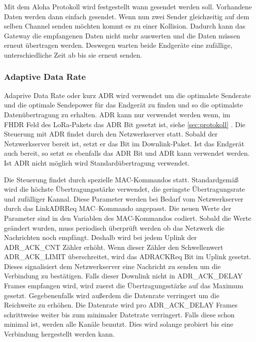 \documentclass[a4paper, 12pt]{article}
\begin{document}
            Mit dem Aloha Protokoll wird festgestellt wann gesendet werden soll. Vorhandene Daten werden dann einfach 
            gesendet. Wenn nun zwei Sender gleichzeitig auf dem selben Channel senden 
            möchten kommt es zu einer Kollision. Dadurch kann das Gateway die empfangenen Daten nicht mehr auswerten 
            und die Daten müssen erneut übertragen werden. Deswegen warten beide Endgeräte eine zufällige, 
            unterschiedliche Zeit ab bis sie erneut senden.

            \subsubsection{Adaptive Data Rate}\label{sec:ADR}
                Adaprive Data Rate oder kurz ADR wird verwendet um die optimalste Senderate und die optimale 
                Sendepower für das Endgerät zu finden und so die optimalste Datenübertragung zu erhalten. ADR kann nur 
                verwendet werden wenn, im FHDR Feld des LoRa-Pakets das ADR Bit gesetzt ist, siehe 
                \ref{sec:protokoll} . Die Steuerung mit ADR findet durch den Netzwerkserver statt. Sobald der 
                Netzwerkserver bereit ist, setzt er das Bit im Downlink-Paket. Ist das Endgerät auch bereit, so 
                setzt es ebenfalls das ADR Bit und ADR kann verwendet werden. Ist ADR nicht möglich wird Standardübertragung 
                verwendet.

                Die Steuerung findet durch spezielle MAC-Kommandos statt. Standardgemäß wird die höchste 
                Übertragungsstärke verwendet, die geringste Übertragungsrate und zufälliger Kannal. Diese Parameter werden bei Bedarf 
                vom Netzwerkserver durch das LinkADRReq MAC–Kommando angepasst. Die 
                neuen Werte der Parameter sind in den Variablen des MAC-Kommandos codiert. Sobald die Werte geändert 
                wurden, muss periodisch überprüft werden ob das 
                Netzwerk die Nachrichten noch empfängt. Deshalb wird bei jedem Uplink der ADR\_ACK\_CNT Zähler erhöht. 
                Wenn dieser Zähler den Schwellenwert ADR\_ACK\_LIMIT
                überschreitet, wird das ADRACKReq Bit im Uplink gesetzt. Dieses signalisiert dem Netzwerkserver eine
                Nachricht zu senden um die Verbindung zu bestätigen. Falls dieser Downlink nicht in 
                ADR\_ACK\_DELAY Frames empfangen wird, wird zuerst die Übertragungsstärke auf das Maximum gesetzt. 
                Gegebenenfalls wird außerdem die Datenrate verringert um die Reichweite zu erhöhen. Die Datenrate wird 
                pro ADR\_ACK\_DELAY Frames schrittweise weiter bis zum minimaler Datetrate verringert. Falls diese schon 
                minimal ist, werden alle Kanäle benutzt. Dies wird solange probiert bis eine Verbindung 
                hergestellt werden kann. \cite[S.19 f]{LoRaSpec}         
\end{document}

